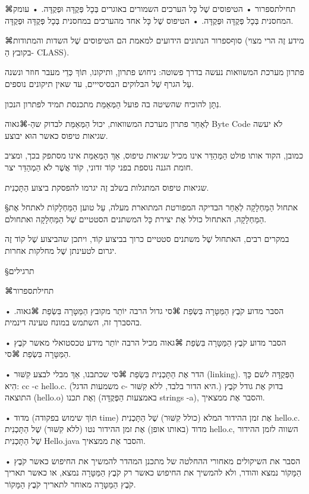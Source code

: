 ⌘תחילת{ספרור}
•  הטיפוסים שֶׁל כָּל הערכים השמורים באוגרים בְּכָל פְּקֻדָּה וּפְקֻדָּה.
•  עומק המחסנית בְּכָל פְּקֻדָּה וּפְקֻדָּה.
•  הטיפוס שֶׁל כָּל אחד מהערכים במחסנית בְּכָל פְּקֻדָּה וּפְקֻדָּה.

⌘סוף{ספרור}
הנתונים הידועים למאמת הם הטיפוסים שֶׁל השדות והמתודות (מידע זֶה הרי מצוי בקובץ
הַ- CLASS).

פתרון מערכת המשוואות נעשה בדרך פשוטה: ניחוש פתרון, ותיקונו, תּוֹךְ כְּדֵי מעבר
חוזר ונשנה עַל הגרף שֶׁל הבלוקים הבסיסייים, עד שאין תיקונים נוספים.

נִתָּן להוכיח שהשיטה בה פועל הַמְּאַמֵּת מתכנסת תמיד לפתרון הנכון.

לְאַחַר פתרון מערכת המשוואות, יכול הַמְּאַמֵּת לבדוק שהַ-⌘גאוה Byte Code לֹא יעשה
שגיאות טיפוס כאשר הוּא יבוצע.

כמובן, הקוד אותו פולט הַמְּהַדֵּר אינו מכיל שגיאות טיפוס, אַךְ הַמְּאַמֵּת אינו
מסתפק בכך, ומציב  חומת הגנה נוספת בפני קוֹד זדוני, קוֹד אֲשֶׁר לֹא הַמְהַדֵּר
יצר.

שגיאות טיפוס המתגלות בשלב זֶה יגרמו להפסקת ביצוע הַתָּכְנִית.

§אתחול הַמַּחְלָקָה
לְאַחַר הבדיקה המפורטת המתוארת מעלה, עַל טוען הַמַּחְלָקוֹת לאתחל אֶת
הַמַּחְלָקָה, האתחול כולל אֶת יצירת כָּל המשתנים הסטטיים שֶׁל הַמַּחְלָקָה
ואתחולם.

במקרים רבים, האתחול שֶׁל משתנים סטטיים כרוך בביצוע קוֹד, ויתכן שהביצוע שֶׁל קוֹד
זֶה יגרום לטעינתן שֶׁל מחלקות אחרות.

§תרגילים

⌘תחילת{ספרור}

• הסבר מדוע קֹבֶץ הַמַּטָּרָה בִּשְׂפַת  ⌘סי גדול הרבה יוֹתֵר מקובץ הַמַּטָּרָה
בִּשְׂפַת ⌘גאוה. בהסברך זה, השתמש במונח טעינה דינמית.

• הסבר מדוע קֹבֶץ הַמַּטָּרָה בִּשְׂפַת ⌘גאוה מכיל הרבה יוֹתֵר מידע טכסטואלי
מאשר קֹבֶץ הַמַּטָּרָה בִּשְׂפַת ⌘סי.

• הדר אֶת הַתָּכְנִית בִּשְׂפַת ⌘סי שכתבנו, אַךְ מבלי לבצע קִשּׁוּר (linking).
הַפְּקֻדָּה לשם כָּךְ הִיא: cc -c hello.c. (משמעות הדגל c- היא הדור בלבד, ללא
קִשּׁוּר.) בדוק אֶת גודל קֹבֶץ התוצאה (hello.o) וְאֶת תכנו (באמצעות הַפְּקֻדָּה strings -a), 
והסבר אֶת ממצאיך.

• מדוד (תּוֹךְ שימוש בפקודה time) אֶת זמן ההידור המלא (כולל קִשּׁוּר) שֶׁל
הַתָּכְנִית hello.c. מדוד (באותו אופן) אֶת זמן ההידור נטו (ללא קִשּׁוּר) שֶׁל
הַתָּכְנִית hello.c, השווה לזמן ההידור שֶׁל הַתָּכְנִית Hello.java והסבר אֶת
ממצאיך.

• הסבר את השיקולים מאחורי ההחלטה של מתכנן המהדר להמשיך את החיפוש כאשר קֹבֶץ
הַמָּקוֹר נמצא והודר, ולא להמשיך את החיפוש כאשר רק קֹבֶץ הַמַּטָּרָה נמצא, או
כאשר תאריך קֹבֶץ הַמַּטָּרָה מאוחר לתאריך קֹבֶץ הַמָּקוֹר.

